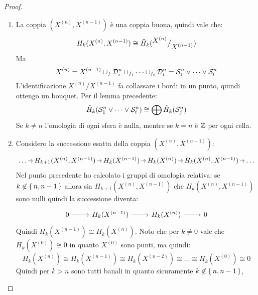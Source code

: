 \begin{proof}
  \begin{enumerate}
  \item
    La coppia $ (X^{(n)}, X^{(n-1)}) $ è una coppia buona, quindi vale che:
    \[
      H_k(X^{(n)}, X^{(n-1)}) \cong \tilde{H}_k({^{\textstyle X^{(n)}}\big/_{\textstyle X^{(n-1)}}})
    \]
    Ma
    \[
      X^{(n)} = X^{(n-1)} \cup_f \mathcal{D}^{n}_{i} \cup_{f_1} \dots \cup_{f_t} \mathcal{D}^{n}_{t} = \mathcal{S}^{n}_{1} \vee \dots \vee \mathcal{S}^{n}_{t}
    \]
    L'identificazione $ {X^{(n)}} \slash {X^{(n-1)}} $ fa collassare i bordi in un punto, quindi ottengo
    un bouquet.
    Per il lemma precedente:
    \[
      \tilde{H}_k(\mathcal{S}^{n}_{1} \vee \dots \vee \mathcal{S}^{n}_{t}) \cong \bigoplus \tilde{H}_k(\mathcal{S}^{n}_{j})
    \]
    Se $ k \not = n $ l'omologia di ogni sfera è nulla, mentre se $ k = n $ è
    $ \mathbb{Z} $ per ogni cella.
  \item
    Considero la successione esatta della coppia $ (X^{(n)}, X^{(n-1)}) $:
    \[
      \begin{tikzcd}[nodes={column sep=7pt, inner sep = 2 pt }]
        \dots \rar & H_{k+1}(X^{(n)}, X^{(n-1)}) \rar & H_k(X^{(n-1)}) \rar & H_k(X^{(n)}) \rar & H_{k}(X^{(n)}, X^{(n-1)}) \rar & \dots
      \end{tikzcd}
    \]
    Nel punto precedente ho calcolato i gruppi di omologia relativa:
    se $ k \not \in \set{n, n-1} $ allora sia
    $ H_{k+1}(X^{(n)}, X^{(n-1)}) $ che $ H_k(X^{(n)}, X^{(n-1)}) $ sono nulli
    quindi la successione diventa:
    \[
      \begin{tikzcd}
        0 \rar   & H_k(X^{(n-1)}) \rar  & H_k(X^{(n)}) \rar & 0
      \end{tikzcd}
    \]
    Quindi $ H_k(X^{(n-1)}) \cong H_k(X^{(n)}) $. Noto che per $ k \not = 0 $ vale che
    $ H_k(X^{(0)}) \cong 0 $ in quanto $ X^{(0)} $ sono punti,
    ma quindi:
    \[
      H_k(X^{(n)}) \cong  H_k(X^{(n-1)}) \cong H_k(X^{(n-2)}) \cong \dots \cong H_k(X^{(0)}) \cong 0
    \]
    Quindi per $ k > n $ sono tutti banali in quanto sicuramente $ k \not \in \set{n, n-1} $,


\end{enumerate}
\end{proof}
